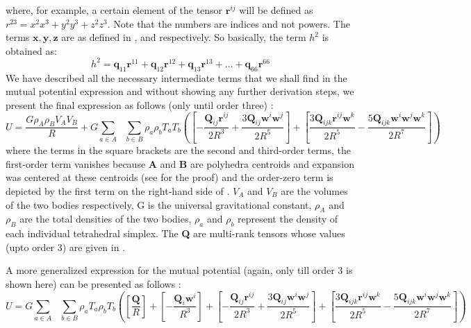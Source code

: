%
where, for example, a certain element of the tensor $\mathbf{r}^{ij}$ will be defined as $r^{23} = x^2x^3 + y^2y^3 + z^2z^3$. Note that the numbers are indices and not powers. The terms $\mathbf{x}, \mathbf{y}, \mathbf{z}$ are as defined in ,  and  respectively. So basically, the term $h^2$ is obtained as:
\begin{equation}
h^2 = \mathbf{q}_{11} \mathbf{r}^{11} + \mathbf{q}_{12} \mathbf{r}^{12} + \mathbf{q}_{13} \mathbf{r}^{13} + \hdots + \mathbf{q}_{66} \mathbf{r}^{66}
\end{equation}
%
We have described all the necessary intermediate terms that we shall find in the mutual potential expression and without showing any further derivation steps, we present the final expression as follows (only until order three) \cite{werner_poly}:
\begin{equation}
\label{U_final_1}
U = \frac{G \rho_A \rho_B V_A V_B}{R} + G \sum_{a\in A} \text{ } \sum_{b\in B} \rho_a \rho_b T_a T_b \left( \left[- \frac{\mathbf{Q}_{ij}\mathbf{r}^{ij}}{2R^3} + \frac{3\mathbf{Q}_{ij} \mathbf{w}^i \mathbf{w}^j}{2R^5} \right] + \left[\frac{3\mathbf{Q}_{ijk} \mathbf{r}^{ij} \mathbf{w}^k}{2R^5} - \frac{5\mathbf{Q}_{ijk} \mathbf{w}^i \mathbf{w}^j \mathbf{w}^k}{2R^7}  \right]  \right)
\end{equation}
%
where the terms in the square brackets are the second and third-order terms, the first-order term vanishes because \textbf{A} and \textbf{B} are polyhedra centroids and expansion was centered at these centroids (see \cite{werner_poly} for the proof) and the order-zero term is depicted by the first term on the right-hand side of . $V_A$ and $V_B$ are the volumes of the two bodies respectively, G is the universal gravitational constant, $\rho_A$ and $\rho_B$ are the total densities of the two bodies, $\rho_a$ and $\rho_b$ represent the density of each individual tetrahedral simplex. The \textbf{Q} are multi-rank tensors whose values (upto order 3) are given in \cite{werner_poly}.

A more generalized expression for the mutual potential (again, only till order 3 is shown here) can be presented as follows \cite{fahn_poly}:
\begin{equation}
\label{U_final_2}
U = G \sum_{a\in A} \text{ } \sum_{b \in B} \rho_a T_a \rho_b T_b \left(\left[\frac{\mathbf{Q}}{R} \right] + \left[-\frac{\mathbf{Q}_i \mathbf{w}^i}{R^3} \right] + \left[- \frac{\mathbf{Q}_{ij}\mathbf{r}^{ij}}{2R^3} + \frac{3\mathbf{Q}_{ij} \mathbf{w}^i \mathbf{w}^j}{2R^5} \right] + \left[\frac{3\mathbf{Q}_{ijk} \mathbf{r}^{ij} \mathbf{w}^k}{2R^5} - \frac{5\mathbf{Q}_{ijk} \mathbf{w}^i \mathbf{w}^j \mathbf{w}^k}{2R^7}  \right] \right)
\end{equation}
%

